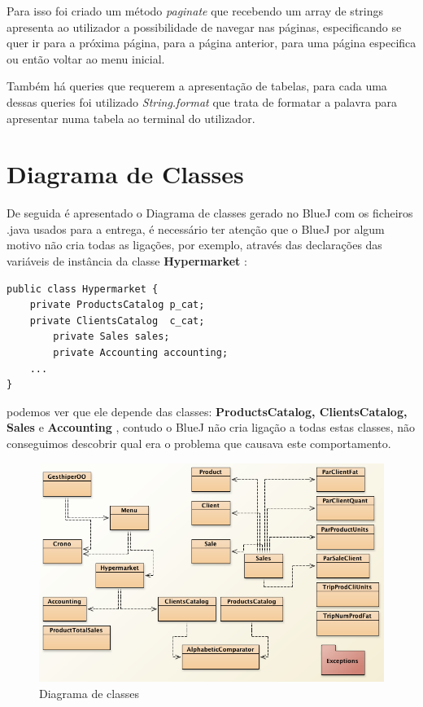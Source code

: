 \documentclass[10pt] {article}
\begin{document}
Para isso foi criado um método \emph{paginate} que recebendo um array de strings apresenta ao utilizador a possibilidade de navegar nas páginas, especificando se quer ir para a próxima página, para a página anterior, para uma página especifica ou então voltar ao menu inicial.

Também há queries que requerem a apresentação de tabelas, para cada uma dessas queries foi utilizado \emph{String.format} que trata de formatar a palavra para apresentar numa tabela ao terminal do utilizador.
\newpage
\section{Diagrama de Classes}
\par De seguida é apresentado o Diagrama de classes gerado no BlueJ com os ficheiros .java usados para a entrega, é
necessário ter atenção que o BlueJ por algum motivo não cria todas as ligações, por exemplo, através das declarações das
variáveis de instância da classe \color{blue} \textbf{Hypermarket} \color{black}:

\begin{lstlisting}
public class Hypermarket {
	private ProductsCatalog p_cat;
   	private ClientsCatalog  c_cat;
    	private Sales sales;
    	private Accounting accounting;
	...
}
\end{lstlisting}

\par podemos ver que ele depende das classes: \color{blue} \textbf{ProductsCatalog, ClientsCatalog, Sales} \color{black} e
\color{blue} \textbf{Accounting} \color{black}, contudo o BlueJ não cria ligação a todas estas classes, não conseguimos
descobrir qual era o problema que causava este comportamento.

\begin{figure}[ht!]
\centering
\includegraphics[width=150mm]{diagram.png}
\caption{Diagrama de classes}
\label{fig:sales}
\end{figure}
\end{document}
